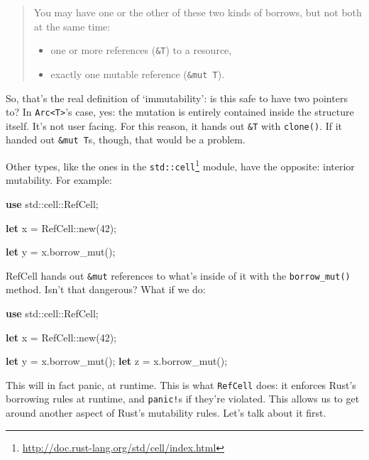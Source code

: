 \documentclass[a4paper,]{book}
\newenvironment{Shaded}{\begin{snugshade}}{\end{snugshade}}
\newcommand{\KeywordTok}[1]{\textcolor[rgb]{0.13,0.29,0.53}{\textbf{{#1}}}}
\newcommand{\DecValTok}[1]{\textcolor[rgb]{0.00,0.00,0.81}{{#1}}}
\newcommand{\NormalTok}[1]{{#1}}
\renewcommand{\href}[2]{#2\footnote{\url{#1}}}
\providecommand{\tightlist}{%
  \setlength{\itemsep}{0pt}\setlength{\parskip}{0pt}}
\begin{document}
\begin{quote}
You may have one or the other of these two kinds of borrows, but not
both at the same time:

\begin{itemize}
\tightlist
\item
  one or more references (\texttt{\&T}) to a resource,
\item
  exactly one mutable reference (\texttt{\&mut\ T}).
\end{itemize}
\end{quote}

So, that's the real definition of `immutability': is this safe to have
two pointers to? In \texttt{Arc\textless{}T\textgreater{}}'s case, yes:
the mutation is entirely contained inside the structure itself. It's not
user facing. For this reason, it hands out \texttt{\&T} with
\texttt{clone()}. If it handed out \texttt{\&mut\ T}s, though, that
would be a problem.

Other types, like the ones in the
\href{http://doc.rust-lang.org/std/cell/index.html}{\texttt{std::cell}}
module, have the opposite: interior mutability. For example:

\begin{Shaded}
\begin{Highlighting}[]
\KeywordTok{use} \NormalTok{std::cell::RefCell;}

\KeywordTok{let} \NormalTok{x = RefCell::new(}\DecValTok{42}\NormalTok{);}

\KeywordTok{let} \NormalTok{y = x.borrow_mut();}
\end{Highlighting}
\end{Shaded}

RefCell hands out \texttt{\&mut} references to what's inside of it with
the \texttt{borrow\_mut()} method. Isn't that dangerous? What if we do:

\begin{Shaded}
\begin{Highlighting}[]
\KeywordTok{use} \NormalTok{std::cell::RefCell;}

\KeywordTok{let} \NormalTok{x = RefCell::new(}\DecValTok{42}\NormalTok{);}

\KeywordTok{let} \NormalTok{y = x.borrow_mut();}
\KeywordTok{let} \NormalTok{z = x.borrow_mut();}
\end{Highlighting}
\end{Shaded}

This will in fact panic, at runtime. This is what \texttt{RefCell} does:
it enforces Rust's borrowing rules at runtime, and \texttt{panic!}s if
they're violated. This allows us to get around another aspect of Rust's
mutability rules. Let's talk about it first.
\end{document}
